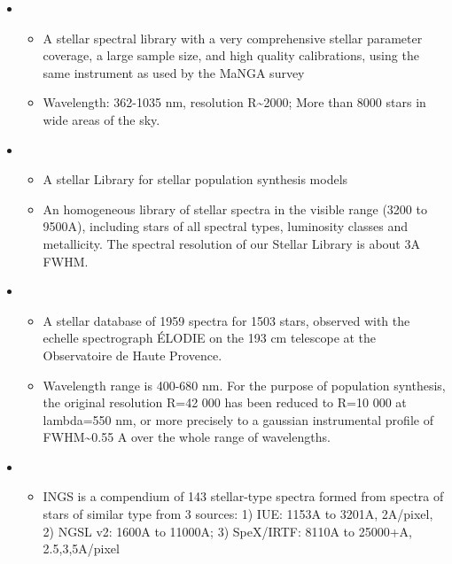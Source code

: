 \documentclass[letterpaper,10pt,english]{sphinxmanual}
\begin{document}
\begin{itemize}
\begin{itemize}
\end{itemize}

\item {} 
\begin{itemize}
\item {} 
A stellar spectral library with a very comprehensive stellar
parameter coverage, a large sample size, and high quality
calibrations, using the same instrument as used by the MaNGA
survey

\item {} 
Wavelength: 362-1035 nm, resolution R\textasciitilde{}2000; More than 8000 stars
in wide areas of the sky.

\end{itemize}

\item {} 
\begin{itemize}
\item {} 
A stellar Library for stellar population synthesis models

\item {} 
An homogeneous library of stellar spectra in the visible range
(3200 to 9500A), including stars of all spectral types, luminosity
classes and metallicity. The spectral resolution of our Stellar
Library is about 3A FWHM.

\end{itemize}

\item {} 
\begin{itemize}
\item {} 
A stellar database of 1959 spectra for 1503 stars, observed with
the echelle spectrograph ÉLODIE on the 193 cm telescope at the
Observatoire de Haute Provence.

\item {} 
Wavelength range is 400-680 nm. For the purpose of population
synthesis, the original resolution R=42 000 has been reduced to
R=10 000 at lambda=550 nm, or more precisely to a gaussian
instrumental profile of FWHM\textasciitilde{}0.55 A over the whole range of
wavelengths.

\end{itemize}

\item {} 
\begin{itemize}
\item {} 
INGS is a compendium of 143 stellar-type spectra formed from
spectra of stars of similar type from 3 sources: 1) IUE: 1153A to
3201A, 2A/pixel, 2) NGSL v2: 1600A to 11000A; 3) SpeX/IRTF: 8110A
to 25000+A, 2.5,3,5A/pixel


\end{itemize}
\end{itemize}
\end{document}
